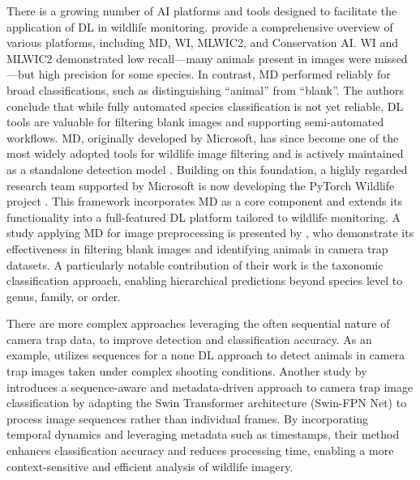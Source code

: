 There is a growing number of \ac{AI} platforms and tools designed to facilitate the application of \ac{DL} in wildlife monitoring.
\textcite{velezChoosingAppropriatePlatform2022} provide a comprehensive overview of various platforms, including \ac{MD}, \ac{WI}, \ac{MLWIC2}, and Conservation \ac{AI}.
\ac{WI} and \ac{MLWIC2} demonstrated low recall—many animals present in images were missed—but high precision for some species.
In contrast, \ac{MD} performed reliably for broad classifications, such as distinguishing \enquote{animal} from \enquote{blank}.
The authors conclude that while fully automated species classification is not yet reliable, \ac{DL} tools are valuable for filtering blank images and supporting semi-automated workflows.
\ac{MD}, originally developed by Microsoft, has since become one of the most widely adopted tools for wildlife image filtering and is actively maintained as a standalone detection model \autocite{morrisEfficientPipelineCamera2025}.
Building on this foundation, a highly regarded research team supported by Microsoft is now developing the PyTorch Wildlife project \autocite{hernandezPytorchWildlifeCollaborativeDeep2024}.
This framework incorporates \ac{MD} as a core component and extends its functionality into a full-featured \ac{DL} platform tailored to wildlife monitoring.
A study applying \ac{MD} for image preprocessing is presented by \textcite{schneiderRecognitionEuropeanMammals2024}, who demonstrate its effectiveness in filtering blank images and identifying animals in camera trap datasets.
A particularly notable contribution of their work is the taxonomic classification approach, enabling hierarchical predictions beyond species level to genus, family, or order.





There are more complex approaches leveraging the often sequential nature of camera trap data, to improve detection and classification accuracy.
As an example, \textcite{zotinANIMALDETECTIONUSING2019} utilizes sequences for a none \ac{DL} approach to detect animals in camera trap images taken under complex shooting conditions.
Another study by \textcite{muhammadTemporalSwinFPNNetNovel2024} introduces a sequence-aware and metadata-driven approach to camera trap image classification by adapting the Swin Transformer architecture (Swin-FPN Net) to process image sequences rather than individual frames. 
By incorporating temporal dynamics and leveraging metadata such as timestamps, their method enhances classification accuracy and reduces processing time, enabling a more context-sensitive and efficient analysis of wildlife imagery.

